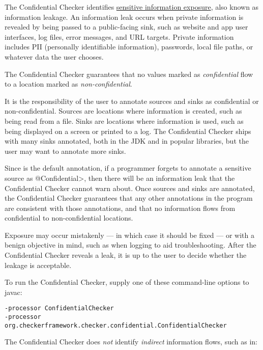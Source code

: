 \htmlhr
{}

The Confidential Checker identifies
\href{https://cwe.mitre.org/data/definitions/1417.html}{sensitive information
exposure}, also known as information leakage. An information leak occurs
when private information is revealed by being passed to a public-facing
sink, such as website and app user interfaces, log files, error messages,
and URL targets.  Private information includes PII (personally identifiable
information), passwords, local file paths, or whatever data the user
chooses.

The Confidential Checker guarantees that no values marked as
\emph{confidential} flow to a location marked as \emph{non-confidential}.

It is the responsibility of the user to annotate sources and sinks as
confidential or non-confidential.  Sources are locations where information
is created, such as being read from a file.  Sinks are locations where
information is used, such as being displayed on a screen or printed to a
log.  The Confidential Checker ships with many sinks annotated, both in the
JDK and in popular libraries, but the user may want to annotate more sinks.

Since  is the default annotation, if a programmer
forgets to annotate a sensitive source as \<@Confidential>, then there will
be an information leak that the Confidential Checker cannot warn about.
Once sources and sinks are annotated, the Confidential Checker guarantees
that any other annotations in the program are consistent with those
annotations, and that no information flows from confidential to
non-confidential locations.

Exposure may occur mistakenly --- in which case
it should be fixed --- or with a benign objective in mind, such as when
logging to aid troubleshooting.  After the Confidential Checker reveals a
leak, it is up to the user to decide whether the leakage is acceptable.

To run the Confidential Checker, supply one of these
command-line options to javac:
\begin{Verbatim}
-processor ConfidentialChecker
-processor org.checkerframework.checker.confidential.ConfidentialChecker
\end{Verbatim}



The Confidential Checker does \emph{not} identify \emph{indirect}
information flows, such as in:

